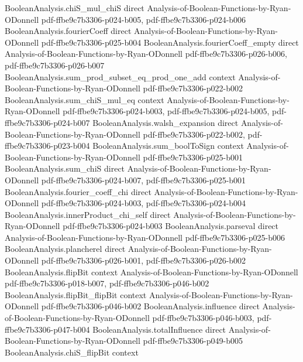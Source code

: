 \begin{theorem}
\proofstep
  {BooleanAnalysis.chiS_mul_chiS}
  {direct}
  {Analysis-of-Boolean-Functions-by-Ryan-ODonnell}
  {pdf-ffbe9c7b3306-p024-b005,
    pdf-ffbe9c7b3306-p024-b006}
\proofstep
  {BooleanAnalysis.fourierCoeff}
  {direct}
  {Analysis-of-Boolean-Functions-by-Ryan-ODonnell}
  {pdf-ffbe9c7b3306-p025-b004}
\proofstep
  {BooleanAnalysis.fourierCoeff_empty}
  {direct}
  {Analysis-of-Boolean-Functions-by-Ryan-ODonnell}
  {pdf-ffbe9c7b3306-p026-b006,
    pdf-ffbe9c7b3306-p026-b007}
\proofstep
  {BooleanAnalysis.sum_prod_subset_eq_prod_one_add}
  {context}
  {Analysis-of-Boolean-Functions-by-Ryan-ODonnell}
  {pdf-ffbe9c7b3306-p022-b002}
\proofstep
  {BooleanAnalysis.sum_chiS_mul_eq}
  {context}
  {Analysis-of-Boolean-Functions-by-Ryan-ODonnell}
  {pdf-ffbe9c7b3306-p024-b003,
    pdf-ffbe9c7b3306-p024-b005,
    pdf-ffbe9c7b3306-p024-b007}
\proofstep
  {BooleanAnalysis.walsh_expansion}
  {direct}
  {Analysis-of-Boolean-Functions-by-Ryan-ODonnell}
  {pdf-ffbe9c7b3306-p022-b002,
    pdf-ffbe9c7b3306-p023-b004}
\proofstep
  {BooleanAnalysis.sum_boolToSign}
  {context}
  {Analysis-of-Boolean-Functions-by-Ryan-ODonnell}
  {pdf-ffbe9c7b3306-p025-b001}
\proofstep
  {BooleanAnalysis.sum_chiS}
  {direct}
  {Analysis-of-Boolean-Functions-by-Ryan-ODonnell}
  {pdf-ffbe9c7b3306-p024-b007,
    pdf-ffbe9c7b3306-p025-b001}
\proofstep
  {BooleanAnalysis.fourier_coeff_chi}
  {direct}
  {Analysis-of-Boolean-Functions-by-Ryan-ODonnell}
  {pdf-ffbe9c7b3306-p024-b003,
    pdf-ffbe9c7b3306-p024-b004}
\proofstep
  {BooleanAnalysis.innerProduct_chi_self}
  {direct}
  {Analysis-of-Boolean-Functions-by-Ryan-ODonnell}
  {pdf-ffbe9c7b3306-p024-b003}
\proofstep
  {BooleanAnalysis.parseval}
  {direct}
  {Analysis-of-Boolean-Functions-by-Ryan-ODonnell}
  {pdf-ffbe9c7b3306-p025-b006}
\proofstep
  {BooleanAnalysis.plancherel}
  {direct}
  {Analysis-of-Boolean-Functions-by-Ryan-ODonnell}
  {pdf-ffbe9c7b3306-p026-b001,
    pdf-ffbe9c7b3306-p026-b002}
\proofstep
  {BooleanAnalysis.flipBit}
  {context}
  {Analysis-of-Boolean-Functions-by-Ryan-ODonnell}
  {pdf-ffbe9c7b3306-p018-b007,
    pdf-ffbe9c7b3306-p046-b002}
\proofstep
  {BooleanAnalysis.flipBit_flipBit}
  {context}
  {Analysis-of-Boolean-Functions-by-Ryan-ODonnell}
  {pdf-ffbe9c7b3306-p046-b002}
\proofstep
  {BooleanAnalysis.influence}
  {direct}
  {Analysis-of-Boolean-Functions-by-Ryan-ODonnell}
  {pdf-ffbe9c7b3306-p046-b003,
    pdf-ffbe9c7b3306-p047-b004}
\proofstep
  {BooleanAnalysis.totalInfluence}
  {direct}
  {Analysis-of-Boolean-Functions-by-Ryan-ODonnell}
  {pdf-ffbe9c7b3306-p049-b005}
\proofstep
  {BooleanAnalysis.chiS_flipBit}
  {context}

\end{theorem}

